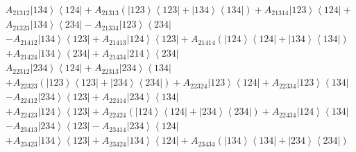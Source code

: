 \documentclass[aps,preprint]{revtex4}%
\begin{document}
\begin{align}
& A_{21312}\left\vert 134\right\rangle \left\langle 124\right\vert
+A_{21313}\left(  \left\vert 123\right\rangle \left\langle 123\right\vert
+\left\vert 134\right\rangle \left\langle 134\right\vert \right)
+A_{21314}\left\vert 123\right\rangle \left\langle 124\right\vert +\\
& A_{21323}\left\vert 134\right\rangle \left\langle 234\right\vert
-A_{21334}\left\vert 123\right\rangle \left\langle 234\right\vert
\end{align}%
\begin{align}
& -A_{21412}\left\vert 134\right\rangle \left\langle 123\right\vert
+A_{21413}\left\vert 124\right\rangle \left\langle 123\right\vert
+A_{21414}\left(  \left\vert 124\right\rangle \left\langle 124\right\vert
+\left\vert 134\right\rangle \left\langle 134\right\vert \right)  \\
& +A_{21424}\left\vert 134\right\rangle \left\langle 234\right\vert
+A_{21434}\left\vert 214\right\rangle \left\langle 234\right\vert
\end{align}%
\begin{align}
& A_{22312}\left\vert 234\right\rangle \left\langle 124\right\vert
+A_{22313}\left\vert 234\right\rangle \left\langle 134\right\vert \\
& +A_{22323}\left(  \left\vert 123\right\rangle \left\langle 123\right\vert
+\left\vert 234\right\rangle \left\langle 234\right\vert \right)
+A_{22324}\left\vert 123\right\rangle \left\langle 124\right\vert
+A_{22334}\left\vert 123\right\rangle \left\langle 134\right\vert
\end{align}%
\begin{align}
& -A_{22412}\left\vert 234\right\rangle \left\langle 123\right\vert
+A_{22414}\left\vert 234\right\rangle \left\langle 134\right\vert \\
& +A_{22423}\left\vert 124\right\rangle \left\langle 123\right\vert
+A_{22424}\left(  \left\vert 124\right\rangle \left\langle 124\right\vert
+\left\vert 234\right\rangle \left\langle 234\right\vert \right)
+A_{22434}\left\vert 124\right\rangle \left\langle 134\right\vert
\end{align}%
\begin{align}
& -A_{23413}\left\vert 234\right\rangle \left\langle 123\right\vert
-A_{23414}\left\vert 234\right\rangle \left\langle 124\right\vert \\
& +A_{23423}\left\vert 134\right\rangle \left\langle 123\right\vert
+A_{23424}\left\vert 134\right\rangle \left\langle 124\right\vert
+A_{23434}\left(  \left\vert 134\right\rangle \left\langle 134\right\vert
+\left\vert 234\right\rangle \left\langle 234\right\vert \right)
\end{align}
\end{document}
